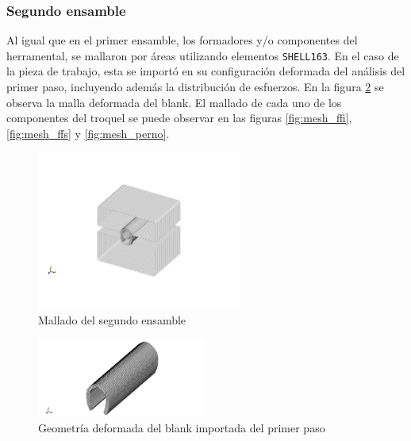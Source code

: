 

\subsubsection{Segundo ensamble}

Al igual que en el primer ensamble, los formadores y/o componentes del herramental, se 
mallaron por áreas utilizando elementos \texttt{SHELL163}. En el caso de la pieza de trabajo, 
esta se importó en su configuración deformada del análisis del primer paso, incluyendo 
además la distribución de esfuerzos. En la figura \ref{fig:mesh_blank_02} se observa 
la malla deformada del blank. El mallado de cada uno de los componentes del troquel 
se puede observar en las figuras \ref{fig:mesh_ffi}, \ref{fig:mesh_ffs} y \ref{fig:mesh_perno}.


\begin{figure}[!h]
\centering
\includegraphics[width=0.6\textwidth]{src/ch3/parts_02.png}
\caption{Mallado del segundo ensamble}
\label{fig:parts_02}
\end{figure}

\begin{figure}[!h]
\centering
\includegraphics[width=0.5\textwidth]{src/ch3/mesh_blank_02.png}
\caption{Geometría deformada del blank importada del primer paso}
\label{fig:mesh_blank_02}
\end{figure}


